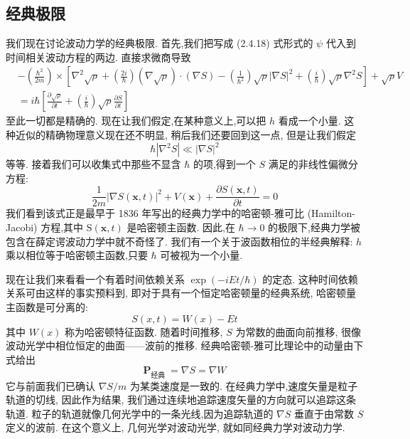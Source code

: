 \documentclass[lang=cn,newtx,10pt,scheme=chinese,thmcnt=section]{elegantbook}
\begin{document}
\subsection*{经典极限}
我们现在讨论波动力学的经典极限. 首先,我们把写成 (2.4.18) 式形式的 $\psi$ 代入到时间相关波动方程的两边. 直接求微商导致
\begin{equation}
	\begin{aligned}
		&- \left( \frac{{\hbar }^{2}}{2m}\right)\times \left\lbrack {{\nabla }^{2}\sqrt{\rho } + \left( \frac{2i}{\hbar }\right) \left( {\nabla \sqrt{\rho }}\right) \cdot \left( {\nabla S}\right) - \left( \frac{1}{{\hbar }^{2}}\right) \sqrt{\rho }{\left| \nabla S\right| }^{2} + \left( \frac{i}{\hbar }\right) \sqrt{\rho }{\nabla }^{2}S}\right\rbrack + \sqrt{\rho }V\\
		&= i\hbar \left\lbrack {\frac{\partial \sqrt{\rho }}{\partial t} + \left( \frac{i}{\hbar }\right) \sqrt{\rho }\frac{\partial S}{\partial t}}\right\rbrack
	\end{aligned}
\end{equation}
至此一切都是精确的. 现在让我们假定,在某种意义上,可以把 $h$ 看成一个小量. 这种近似的精确物理意义现在还不明显, 稍后我们还要回到这一点, 但是让我们假定
\begin{equation}
	\hbar \left| {{\nabla }^{2}S}\right| \ll {\left| \nabla S\right| }^{2}
\end{equation}
等等. 接着我们可以收集式中那些不显含 $\hbar$ 的项,得到一个 $S$ 满足的非线性偏微分方程:
\begin{equation}
	\frac{1}{2m}{\left| \nabla S\left( \mathbf{x}, t\right) \right| }^{2} + V\left( \mathbf{x}\right) + \frac{\partial S\left( {\mathbf{x}, t}\right) }{\partial t} = 0
\end{equation}
我们看到该式正是最早于 1836 年写出的经典力学中的哈密顿-雅可比 (Hamilton-Jacobi) 方程,其中 $\mathrm{S}\left( {\mathbf{x}, t}\right)$ 是哈密顿主函数. 因此,在 $\hbar \rightarrow 0$ 的极限下,经典力学被包含在薛定谔波动力学中就不奇怪了. 我们有一个关于波函数相位的半经典解释: $h$ 乘以相位等于哈密顿主函数,只要 $\hbar$ 可被视为一个小量.

现在让我们来看看一个有着时间依赖关系 $\exp \left( {-{iEt}/\hbar }\right)$ 的定态. 这种时间依赖关系可由这样的事实预料到, 即对于具有一个恒定哈密顿量的经典系统, 哈密顿量主函数是可分离的:
\begin{equation}
	S\left( {x, t}\right) = W\left( x\right) - {Et}
\end{equation}
其中 $W\left( x\right)$ 称为哈密顿特征函数. 随着时间推移, $S$ 为常数的曲面向前推移, 很像波动光学中相位恒定的曲面——波前的推移. 经典哈密顿-雅可比理论中的动量由下式给出
\begin{equation}
	{\mathbf{P}}_{\text{经典 }} = \nabla S = \nabla W
\end{equation}
它与前面我们已确认 $\nabla S/m$ 为某类速度是一致的. 在经典力学中,速度矢量是粒子轨道的切线, 因此作为结果, 我们通过连续地追踪速度矢量的方向就可以追踪这条轨道. 粒子的轨道就像几何光学中的一条光线,因为追踪轨道的 $\nabla S$ 垂直于由常数 $S$ 定义的波前. 在这个意义上, 几何光学对波动光学, 就如同经典力学对波动力学.
\end{document}
